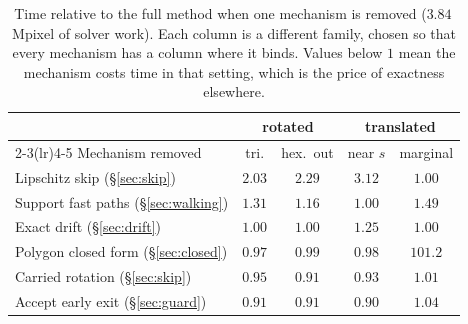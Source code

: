 \begin{table}[t]
  \centering
  \small
  \caption{Time relative to the full method when one mechanism is removed
  ($3.84$\,Mpixel of solver work). Each column is a different family, chosen so
  that every mechanism has a column where it binds. Values below $1$ mean the
  mechanism costs time in that setting, which is the price of exactness
  elsewhere.}
  \label{tab:ablation}
  \begin{tabular}{lcccc}
    \toprule
     & \multicolumn{2}{c}{rotated} & \multicolumn{2}{c}{translated} \\
    \cmidrule(lr){2-3}\cmidrule(lr){4-5}
    Mechanism removed & tri. & hex.\ out & near $s$ & marginal \\
    \midrule
    Lipschitz skip (\S\ref{sec:skip}) & $2.03$ & $2.29$ & $3.12$ & $1.00$ \\
    Support fast paths (\S\ref{sec:walking}) & $1.31$ & $1.16$ & $1.00$ & $1.49$ \\
    Exact drift (\S\ref{sec:drift}) & $1.00$ & $1.00$ & $1.25$ & $1.00$ \\
    Polygon closed form (\S\ref{sec:closed}) & $0.97$ & $0.99$ & $0.98$ & $\mathbf{101.2}$ \\
    Carried rotation (\S\ref{sec:skip}) & $0.95$ & $0.91$ & $0.93$ & $1.01$ \\
    Accept early exit (\S\ref{sec:guard}) & $0.91$ & $0.91$ & $0.90$ & $1.04$ \\
    \bottomrule
  \end{tabular}
\end{table}
